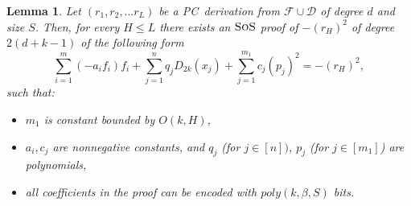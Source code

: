 \documentclass[11pt]{article}
\newcommand{\sos}{\text{\sc{SoS}}}
\newcommand{\PC}{\textsc{PC}}
\newcommand{\1}{\textbf{1}}
\newtheorem{lemma}[theorem]{Lemma}
\begin{document}
\begin{lemma}\label{th:sos_sim_PC_1}
    Let $(r_1, r_2, \dots r_L)$ be a \PC\ derivation from $\mathcal{F}\cup \mathcal{D}$ of degree $d$ and size $S$. Then, for every $H\leq L$ there exists an $\sos$ proof of $-(r_H)^2$ of degree $2(d+k-1)$ of the following form
    \begin{equation}\label{eq:sosstep}
         \sum_{i=1}^m (-a_i f_i) f_i + \sum_{j=1}^{n} q_j D_{2k}(x_j) +\sum_{j=1}^{m_1} c_{j}(p_{j})^2=-(r_H)^2,
    \end{equation}
    such that:
    \begin{itemize}
        \item $m_1$ is constant bounded by $O(k, H)$,
        \item $a_i, c_j$ are nonnegative constants, and $q_j$ (for $j\in [n])$, $p_j$ (for $j\in [m_1]$) are polynomials,
        
        \item all coefficients in the proof can be encoded with $poly(k, \beta, S)$ bits.
    \end{itemize}
\end{lemma}
\end{document}

